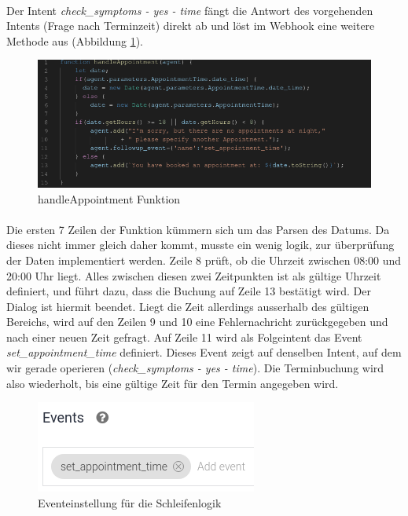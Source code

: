 \documentclass[11pt,a4paper]{article}
\begin{document}
        \paragraph{}
            Der Intent \emph{check\_symptoms - yes - time} fängt die Antwort des vorgehenden Intents (Frage nach Terminzeit) direkt ab und löst im Webhook
            eine weitere Methode aus (Abbildung \ref{fig:handleappointmentfunction}).
        \begin{figure}[h!]
            \begin{center}
                \includegraphics[width=0.7\linewidth]{handleAppointmentFunction.png}
				\caption{handleAppointment Funktion}
	            \label{fig:handleappointmentfunction}
            \end{center}
        \end{figure}

        \paragraph{}
            Die ersten 7 Zeilen der Funktion kümmern sich um das Parsen des Datums. Da dieses nicht immer gleich daher kommt,
            musste ein wenig logik, zur überprüfung der Daten implementiert werden. Zeile 8 prüft, ob die Uhrzeit zwischen 08:00
            und 20:00 Uhr liegt. Alles zwischen diesen zwei Zeitpunkten ist als gültige Uhrzeit definiert, und führt dazu, dass die
            Buchung auf Zeile 13 bestätigt wird. Der Dialog ist hiermit beendet. Liegt die Zeit allerdings ausserhalb des gültigen
            Bereichs, wird auf den Zeilen 9 und 10 eine Fehlernachricht zurückgegeben und nach einer neuen Zeit gefragt.
            Auf Zeile 11 wird als Folgeintent das Event \emph{set\_appointment\_time} definiert. Dieses Event zeigt auf denselben 
            Intent, auf dem wir gerade operieren (\emph{check\_symptoms - yes - time}). Die Terminbuchung wird also wiederholt, bis
            eine gültige Zeit für den Termin angegeben wird. 

        \begin{figure}[h!]
            \begin{center}
                \includegraphics[width=0.5\linewidth]{eventSetting.png}
				\caption{Eventeinstellung für die Schleifenlogik}
            	\label{fig:eventSetting}
            \end{center}
        \end{figure}
 
\end{document}
